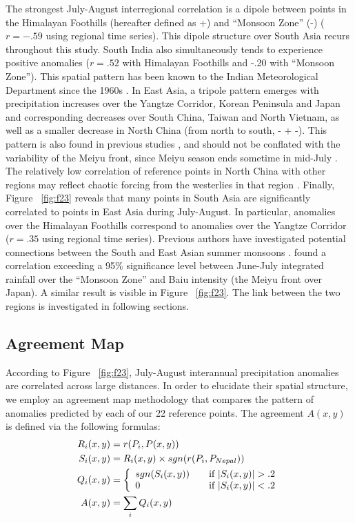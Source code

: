 	 The strongest July-August interregional correlation is a dipole between points in the Himalayan Foothills (hereafter defined as +) and ``Monsoon Zone'' (-) ($r=-.59$ using regional time series). This dipole structure over South Asia recurs throughout this study. South India also simultaneously tends to experience positive anomalies ($r=.52$ with Himalayan Foothills and -.20 with ``Monsoon Zone''). This spatial pattern has been known to the Indian Meteorological Department since the 1960s \citep{Krishnamurthy2000}. In East Asia, a tripole pattern emerges with precipitation increases over the Yangtze Corridor, Korean Peninsula and Japan and corresponding decreases over South China, Taiwan and North Vietnam, as well as a smaller decrease in North China (from north to south, - + -). This pattern is also found in previous studies \citep{Ding2008}, and should not be conflated with the variability of the Meiyu front, since Meiyu season ends sometime in mid-July \citep{Wang2002}. The relatively low correlation of reference points in North China with other regions may reflect chaotic forcing from the westerlies in that region \citep{Kosaka2012}. Finally, Figure ~\ref{fig:f23} reveals that many points in South Asia are significantly correlated to points in East Asia during July-August. In particular, anomalies over the Himalayan Foothills correspond to anomalies over the Yangtze Corridor ($r=.35$ using regional time series). Previous authors have investigated potential connections between the South and East Asian summer monsoons \citep{Lau2000,Liu2008}. \cite{Krishnan2001} found a correlation exceeding a 95\% significance level between June-July integrated rainfall over the ``Monsoon Zone'' and Baiu intensity (the Meiyu front over Japan). A similar result is visible in Figure ~\ref{fig:f23}. The link between the two regions is investigated in following sections.
		
\subsection{Agreement Map}

	According to Figure ~\ref{fig:f23}, July-August interannual precipitation anomalies are correlated across large distances. In order to elucidate their spatial structure, we employ an agreement map methodology that compares the pattern of anomalies predicted by each of our 22 reference points. The agreement $A(x,y)$ is defined via the following formulas:
	\begin{align*}
	R_i(x,y)& = r(P_i,P(x,y)) \\
	S_i(x,y)& = R_i(x,y) \times sgn(r(P_i,P_{Nepal})) \\
	Q_i(x,y)& = \left\{
		\begin{array}{l l}
	 		sgn(S_i(x,y)) & \quad \text{if $|S_i(x,y)|>.2$} \\
	 		0 & \quad \text{if $|S_i(x,y)|<.2$}
	 	\end{array} \right. \\
	A(x,y)& = \sum_{i}Q_i(x,y)
	\end{align*}	

